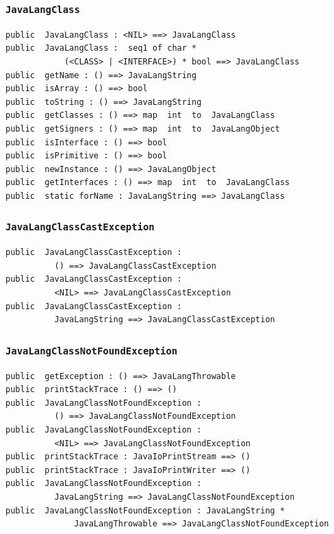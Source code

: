 \documentclass[\pformat,12pt]{article}
\begin{document}
\subsubsection{\texttt{JavaLangClass}}
\begin{small}
\begin{verbatim}
public  JavaLangClass : <NIL> ==> JavaLangClass
public  JavaLangClass :  seq1 of char * 
            (<CLASS> | <INTERFACE>) * bool ==> JavaLangClass
public  getName : () ==> JavaLangString
public  isArray : () ==> bool
public  toString : () ==> JavaLangString
public  getClasses : () ==> map  int  to  JavaLangClass
public  getSigners : () ==> map  int  to  JavaLangObject
public  isInterface : () ==> bool
public  isPrimitive : () ==> bool
public  newInstance : () ==> JavaLangObject
public  getInterfaces : () ==> map  int  to  JavaLangClass
public  static forName : JavaLangString ==> JavaLangClass
\end{verbatim}
\end{small}

\subsubsection{\texttt{JavaLangClassCastException}}
\begin{small}
\begin{verbatim}
public  JavaLangClassCastException : 
          () ==> JavaLangClassCastException
public  JavaLangClassCastException : 
          <NIL> ==> JavaLangClassCastException
public  JavaLangClassCastException : 
          JavaLangString ==> JavaLangClassCastException
\end{verbatim}
\end{small}

\subsubsection{\texttt{JavaLangClassNotFoundException}}
\begin{small}
\begin{verbatim}
public  getException : () ==> JavaLangThrowable
public  printStackTrace : () ==> ()
public  JavaLangClassNotFoundException : 
          () ==> JavaLangClassNotFoundException
public  JavaLangClassNotFoundException : 
          <NIL> ==> JavaLangClassNotFoundException
public  printStackTrace : JavaIoPrintStream ==> ()
public  printStackTrace : JavaIoPrintWriter ==> ()
public  JavaLangClassNotFoundException : 
          JavaLangString ==> JavaLangClassNotFoundException
public  JavaLangClassNotFoundException : JavaLangString * 
              JavaLangThrowable ==> JavaLangClassNotFoundException
\end{verbatim}
\end{small}
\end{document}
